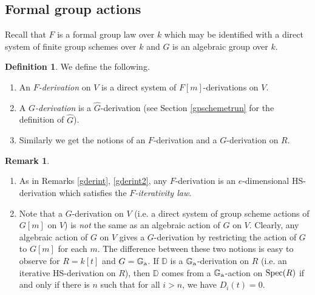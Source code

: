 \documentclass[10pt]{amsart}
\theoremstyle{definition}
\newtheorem{definition}[theorem]{Definition}
\newtheorem{remark}[theorem]{Remark}
\begin{document}
\subsection{Formal group actions}
Recall that $F$ is a formal group law over $k$ which may be identified with a direct system of finite group schemes over $k$ and $G$ is an algebraic group over $k$.
\begin{definition} We define the following.
\begin{enumerate}
\item An \emph{$F$-derivation} on $V$ is a direct system of $F[m]$-derivations on $V$.

\item A \emph{$G$-derivation} is a $\widehat{G}$-derivation (see Section \ref{gpschemetrun} for the definition of $\widehat{G}$).

\item Similarly we get the notions of an $F$-derivation and a $G$-derivation on $R$.
\end{enumerate}
\end{definition}
\begin{remark}
\begin{enumerate}
\item As in Remarks \ref{gderint}, \ref{gderint2}, any $F$-derivation is an $e$-dimensional HS-derivation which satisfies the \emph{$F$-iterativity law}.


\item Note that a $G$-derivation on $V$ (i.e. a direct system of group scheme actions of $G[m]$ on $V$) is \emph{not} the same as an algebraic action of $G$ on $V$. Clearly, any algebraic action of $G$ on $V$ gives a $G$-derivation by restricting the action of $G$ to $G[m]$ for each $m$. The difference between these two notions is easy to observe for $R=k[t]$ and $G=\mathbb{G}_{\rm{a}}$. If $\mathbb{D}$ is a $\mathbb{G}_{\rm{a}}$-derivation on $R$ (i.e. an iterative HS-derivation on $R$), then $\mathbb{D}$ comes from a $\mathbb{G}_{\rm{a}}$-action on $\operatorname{Spec}(R)$ if and only if there is $n$ such that for all $i>n$, we have $D_i(t)=0$.

\end{enumerate}
\end{remark}
\end{document}

